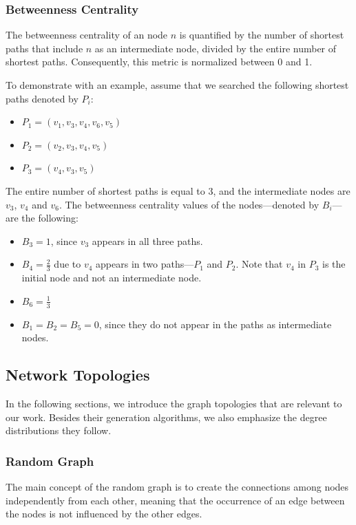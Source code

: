 \subsubsection{Betweenness Centrality}

The betweenness centrality of an node $n$ is quantified by the number of shortest paths that include $n$ as an intermediate node, divided by the entire number of shortest paths. Consequently, this metric is normalized between 0 and 1.

To demonstrate with an example, assume that we searched the following shortest paths denoted by $P_i$:
\begin{itemize}
	\item $P_1 = (v_1, v_3, v_4, v_6, v_5)$
	\item $P_2 = (v_2, v_3, v_4, v_5)$
	\item $P_3 = (v_4, v_3, v_5)$
\end{itemize}

The entire number of shortest paths is equal to 3, and the intermediate nodes are $v_3$, $v_4$ and $v_6$. The betweenness centrality values of the nodes---denoted by $B_i$---are the following:
\begin{itemize}
	\item $B_3 = 1$, since $v_3$ appears in all three paths.
	\item $B_4 = \frac{2}{3}$ due to $v_4$ appears in two paths---$P_1$ and $P_2$. Note that $v_4$ in $P_3$ is the initial node and not an intermediate node.
	\item $B_6 = \frac{1}{3}$
	\item $B_1 = B_2 = B_5 = 0$, since they do not appear in the paths as intermediate nodes.
\end{itemize}
\subsection{Network Topologies} \label{sec:topologies}

In the following sections, we introduce the graph topologies that are relevant to our work. Besides their generation algorithms, we also emphasize the degree distributions they follow.

\subsubsection{Random Graph}

The main concept of the random graph is to create the connections among nodes independently from each other, meaning that the occurrence of an edge between the nodes is not influenced by the other edges. 

